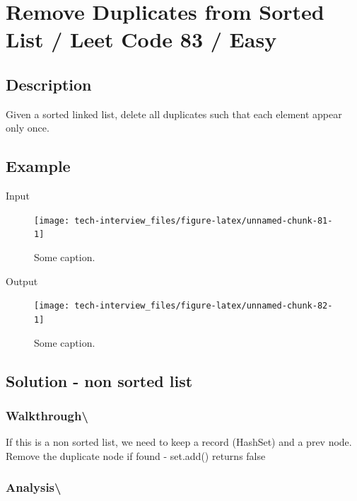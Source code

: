 \documentclass[]{book}
\begin{document}
\hypertarget{remove-duplicates-from-sorted-list-leet-code-83-easy}{%
\section{Remove Duplicates from Sorted List / Leet Code 83 / Easy}\label{remove-duplicates-from-sorted-list-leet-code-83-easy}}

\hypertarget{description-100}{%
\subsection{Description}\label{description-100}}

Given a sorted linked list, delete all duplicates such that each element appear only once.

\hypertarget{example-96}{%
\subsection{Example}\label{example-96}}

Input

\begin{figure}
\texttt{[image: tech-interview\_files/figure-latex/unnamed-chunk-81-1]} \caption{Some caption.}\label{fig:unnamed-chunk-81}
\end{figure}

Output

\begin{figure}
\texttt{[image: tech-interview\_files/figure-latex/unnamed-chunk-82-1]} \caption{Some caption.}\label{fig:unnamed-chunk-82}
\end{figure}

\hypertarget{solution---non-sorted-list}{%
\subsection{Solution - non sorted list}\label{solution---non-sorted-list}}

\hypertarget{walkthrough-117}{%
\subsubsection{Walkthrough\textbackslash{}}\label{walkthrough-117}}

If this is a non sorted list, we need to keep a record (HashSet) and a prev node. Remove the duplicate node if
found - set.add() returns false

\hypertarget{analysis-124}{%
\subsubsection{Analysis\textbackslash{}}\label{analysis-124}}
\end{document}
